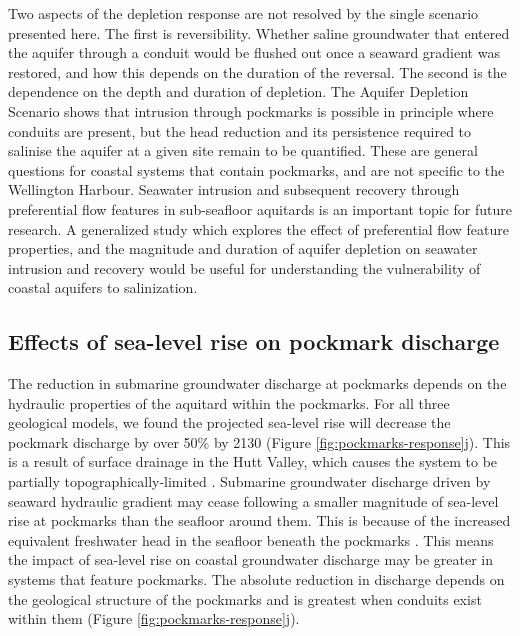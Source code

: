 \documentclass[draft, 10pt]{agujournal2019}
\begin{document}
Two aspects of the depletion response are not resolved by the single scenario presented here.
The first is reversibility.
Whether saline groundwater that entered the aquifer through a conduit would be flushed out once a seaward gradient was restored, and how this depends on the duration of the reversal.
The second is the dependence on the depth and duration of depletion.
The Aquifer Depletion Scenario shows that intrusion through pockmarks is possible in principle where conduits are present, but the head reduction and its persistence required to salinise the aquifer at a given site remain to be quantified.
These are general questions for coastal systems that contain pockmarks, and are not specific to the Wellington Harbour.
Seawater intrusion and subsequent recovery through preferential flow features in sub-seafloor aquitards is an important topic for future research.
A generalized study which explores the effect of preferential flow feature properties, and the magnitude and duration of aquifer depletion on seawater intrusion and recovery would be useful for understanding the vulnerability of coastal aquifers to salinization.

\subsection{Effects of sea-level rise on pockmark discharge}
The reduction in submarine groundwater discharge at pockmarks depends on the hydraulic properties of the aquitard within the pockmarks.
For all three geological models, we found the projected sea-level rise will decrease the pockmark discharge by over 50\% by 2130 (Figure \ref{fig:pockmarks-response}j).
This is a result of surface drainage in the Hutt Valley, which causes the system to be partially topographically-limited \cite{bennett_hutt_2024, michael_global_2013}.
Submarine groundwater discharge driven by seaward hydraulic gradient may cease following a smaller magnitude of sea-level rise at pockmarks than the seafloor around them.
This is because of the increased equivalent freshwater head in the seafloor beneath the pockmarks \cite{post_variable_2022}.
This means the impact of sea-level rise on coastal groundwater discharge may be greater in systems that feature pockmarks.
The absolute reduction in discharge depends on the geological structure of the pockmarks and is greatest when conduits exist within them (Figure \ref{fig:pockmarks-response}j).
\end{document}
